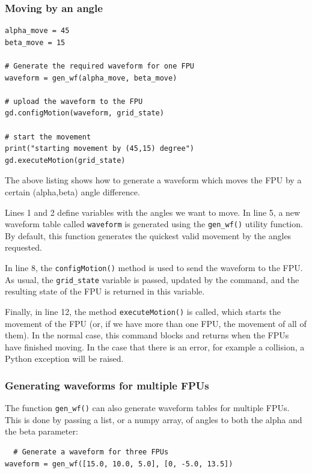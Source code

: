 \documentclass[11pt,a4paper]{scrartcl}
\begin{document}
\subsubsection{Moving by an angle}
\begin{verbatim}
alpha_move = 45
beta_move = 15

# Generate the required waveform for one FPU
waveform = gen_wf(alpha_move, beta_move)

# upload the waveform to the FPU
gd.configMotion(waveform, grid_state)

# start the movement
print("starting movement by (45,15) degree")
gd.executeMotion(grid_state)
\end{verbatim}

The above listing shows how to generate a waveform which moves the FPU
by a certain (alpha,beta) angle difference.

Lines 1 and 2 define variables with the angles we want to move. In
line 5, a new waveform table called \texttt{waveform} is generated
using the \texttt{gen\_wf()} utility function.  By default, this
function generates the quickest valid movement by the angles
requested.

In line 8, the \texttt{configMotion()} method is used to send the
waveform to the FPU. As usual, the \texttt{grid\_state} variable is
passed, updated by the command, and the resulting state of the FPU is
returned in this variable.

Finally, in line 12, the method \texttt{executeMotion()} is called,
which starts the movement of the FPU (or, if we have more than one
FPU, the movement of all of them). In the normal case, this command
blocks and returns when the FPUs have finished moving.  In the case
that there is an error, for example a collision, a Python exception
will be raised.

\subsubsection{Generating waveforms for multiple FPUs}
The function \texttt{gen\_wf()} can also generate waveform tables for
multiple FPUs. This is done by passing a list, or a numpy array,
of angles to both the alpha and the beta parameter:

\begin{verbatim}
  # Generate a waveform for three FPUs
waveform = gen_wf([15.0, 10.0, 5.0], [0, -5.0, 13.5])
\end{verbatim}
\end{document}
